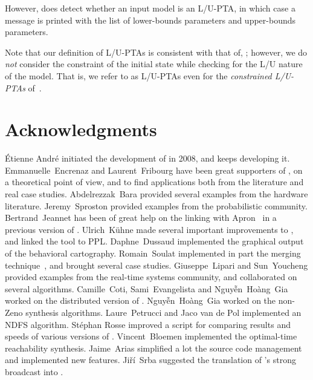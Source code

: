 However, \imitator{} does detect whether an input model is an L/U-PTA, in which case a message is printed with the list of lower-bounds parameters and upper-bounds parameters.

\begin{remark}
	Note that our definition of L/U-PTAs is consistent with that of, \eg{} \cite{BlT09}; however, we do \emph{not} consider the constraint of the initial state while checking for the L/U nature of the model.
	That is, we refer to as L/U-PTAs even for the \emph{constrained L/U-PTAs} of~\cite{BlT09}.
\end{remark}




\chapter{Acknowledgments}

\sloppy
\'Etienne André initiated the development of \imitator{} in 2008, and keeps developing it.
Emmanuelle~Encrenaz and Laurent~Fribourg have been great supporters of \imitator{}, on a theoretical point of view, and to find applications both from the literature and real case studies.
Abdelrezzak~Bara provided several examples from the hardware literature.
Jeremy~Sproston provided examples from the probabilistic community.
Bertrand~Jeannet has been of great help on the linking with Apron~\cite{JM09} in a previous version of \imitator{}.
Ulrich~K\"uhne made several important improvements to \imitator{}, and linked the tool to PPL.
Daphne~Dussaud implemented the graphical output of the behavioral cartography.
Romain~Soulat implemented in part the merging technique~\cite{AFS13atva}, and brought several case studies.
Giuseppe~Lipari and Sun~Youcheng provided examples from the real-time systems community, and collaborated on several algorithms.
Camille~Coti, Sami~Evangelista and Nguy\~{ê}n~Hoàng~Gia worked on the distributed version of \imitator{}.
Nguy\~{ê}n~Hoàng~Gia worked on the non-Zeno synthesis algorithms.
Laure~Petrucci and Jaco van de Pol implemented an NDFS algorithm.
%
Stéphan Rosse improved a script for comparing results and speeds of various versions of \imitator{}.
%
Vincent~Bloemen implemented the optimal-time reachability synthesis.
%
Jaime~Arias simplified a lot the source code management and implemented new features.
%
Jiří~Srba suggested the translation of \imitator{}'s strong broadcast into \uppaal{}.

